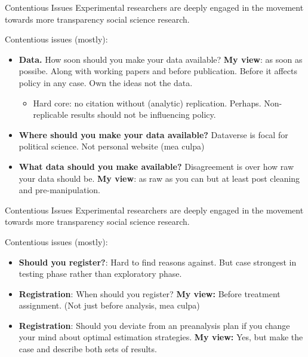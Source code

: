 \documentclass[
  11pt,
  ignorenonframetext,
]{beamer}
\providecommand{\tightlist}{%
  \setlength{\itemsep}{0pt}\setlength{\parskip}{0pt}}\usepackage{longtable,booktabs,array}
\begin{document}
\begin{frame}{Contentious Issues}
\protect\hypertarget{contentious-issues-1}{}
Experimental researchers are deeply engaged in the movement towards more
transparency social science research.

Contentious issues (mostly):

\begin{itemize}
\item
  \textbf{Data.} How soon should you make your data available?
  \textbf{My view}: as soon as possibe. Along with working papers and
  before publication. Before it affects policy in any case. Own the
  ideas not the data.

  \begin{itemize}
  \tightlist
  \item
    Hard core: no citation without (analytic) replication. Perhaps.
    Non-replicable results should not be influencing policy.
  \end{itemize}
\item
  \textbf{Where should you make your data available?} Dataverse is focal
  for political science. Not personal website (mea culpa)
\item
  \textbf{What data should you make available?} Disagreement is over how
  raw your data should be. \textbf{My view}: as raw as you can but at
  least post cleaning and pre-manipulation.
\end{itemize}
\end{frame}

\begin{frame}{Contentious Issues}
\protect\hypertarget{contentious-issues-2}{}
Experimental researchers are deeply engaged in the movement towards more
transparency social science research.

Contentious issues (mostly):

\begin{itemize}
\item
  \textbf{Should you register?}: Hard to find reasons against. But case
  strongest in testing phase rather than exploratory phase.
\item
  \textbf{Registration}: When should you register? \textbf{My view:}
  Before treatment assignment. (Not just before analysis, mea culpa)
\item
  \textbf{Registration}: Should you deviate from an preanalysis plan if
  you change your mind about optimal estimation strategies. \textbf{My
  view:} Yes, but make the case and describe both sets of results.
\end{itemize}
\end{frame}
\end{document}
